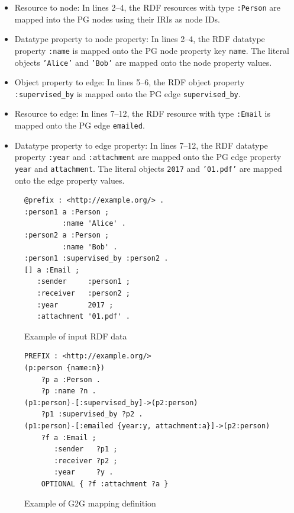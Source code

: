 \documentclass[runningheads]{llncs}
\begin{document}
\begin{itemize}
    \item Resource to node: In lines 2--4, the RDF resources with type \texttt{:Person} are mapped into the PG nodes using their IRIs as node IDs.
    \item Datatype property to node property: In lines 2--4, the RDF datatype property \texttt{:name} is mapped onto the PG node property key \texttt{name}. The literal objects \texttt{'Alice'} and \texttt{'Bob'} are mapped onto the node property values.
    \item Object property to edge: In lines 5--6, the RDF object property \texttt{:supervised\_by} is mapped onto the PG edge \texttt{supervised\_by}.
    \item Resource to edge: In lines 7--12, the RDF resource with type \texttt{:Email} is mapped onto the PG edge \texttt{emailed}. 
    \item Datatype property to edge property: In lines 7--12, the RDF datatype property \texttt{:year} and \texttt{:attachment} are mapped onto the PG edge property \texttt{year} and \texttt{attachment}. The literal objects \texttt{2017} and \texttt{'01.pdf'} are mapped onto the edge property values.
\end{itemize}


\begin{figure}[!t]
\begin{scriptsize}
\begin{verbatim}
@prefix : <http://example.org/> .
:person1 a :Person ;
         :name 'Alice' .
:person2 a :Person ;
         :name 'Bob' .
:person1 :supervised_by :person2 .
[] a :Email ;
   :sender     :person1 ;
   :receiver   :person2 ;
   :year       2017 ;
   :attachment '01.pdf' .
\end{verbatim}
\end{scriptsize}
\caption{Example of input RDF data}
\label{fig:example-rdf}
\end{figure}


\begin{figure}[!t]
\begin{scriptsize}
\begin{verbatim}
PREFIX : <http://example.org/>
(p:person {name:n})
    ?p a :Person .
    ?p :name ?n .
(p1:person)-[:supervised_by]->(p2:person)
    ?p1 :supervised_by ?p2 .
(p1:person)-[:emailed {year:y, attachment:a}]->(p2:person)
    ?f a :Email ;
       :sender   ?p1 ;
       :receiver ?p2 ;
       :year     ?y .
    OPTIONAL { ?f :attachment ?a }
\end{verbatim}
\end{scriptsize}
\caption{Example of G2G mapping definition}
\label{fig:example-g2g}
\end{figure}
\end{document}
